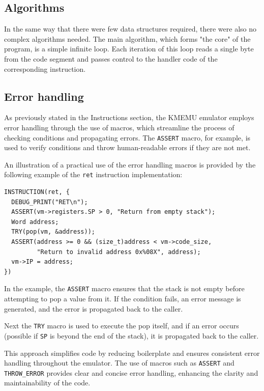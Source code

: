 \documentclass[12pt,a4paper]{paper}
\newcommand{\code}[1]{\texttt{#1}}
\begin{document}
\subsection{Algorithms}

In the same way that there were few data structures required, there were also no
complex algorithms needed. The main algorithm, which forms "the core" of the
program, is a simple infinite loop. Each iteration of this loop reads a single
byte from the code segment and passes control to the handler code of the
corresponding instruction.

\subsection{Error handling}

As previously stated in the Instructions section, the KMEMU emulator employs
error handling through the use of macros, which streamline the process of
checking conditions and propagating errors. The \code{ASSERT} macro, for
example, is used to verify conditions and throw human-readable errors if they
are not met.

An illustration of a practical use of the error handling macros is provided by
the following example of the \code{ret} instruction implementation:

\begin{verbatim}
INSTRUCTION(ret, {
  DEBUG_PRINT("RET\n");
  ASSERT(vm->registers.SP > 0, "Return from empty stack");
  Word address;
  TRY(pop(vm, &address));
  ASSERT(address >= 0 && (size_t)address < vm->code_size,
         "Return to invalid address 0x%08X", address);
  vm->IP = address;
})
\end{verbatim}

In the example, the \code{ASSERT} macro ensures that the stack is not empty
before attempting to pop a value from it. If the condition fails, an error
message is generated, and the error is propagated back to the caller.

Next the \code{TRY} macro is used to execute the pop itself, and if an error
occurs (possible if \code{SP} is beyond the end of the stack), it is propagated
back to the caller.

This approach simplifies code by reducing boilerplate and ensures consistent
error handling throughout the emulator. The use of macros such as \code{ASSERT}
and \code{THROW_ERROR} provides clear and concise error handling, enhancing the
clarity and maintainability of the code.
\end{document}
